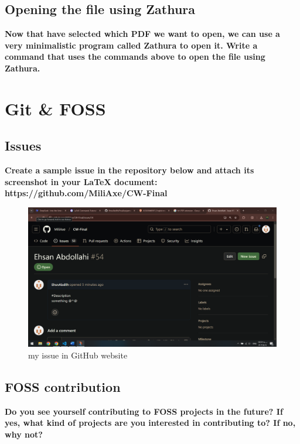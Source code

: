 \documentclass{article}
\begin{document}
    \subsection{Opening the file using Zathura}
    \textbf{Now that have selected which PDF we want to open, we can use a very minimalistic program called Zathura to open it. Write a command that uses the commands above to open the file using Zathura.}

    \section{Git \& FOSS}
    \subsection{Issues}
    \textbf{Create a sample issue in the repository below and attach its screenshot in your LaTeX document: https://github.com/MiliAxe/CW-Final}
    \begin{figure}[h]
        \centering
        \includegraphics[width=1\textwidth]{Screenshot.png}
        \caption{my issue in GitHub website}
        \label{fig:my_image}
    \end{figure}
    \subsection{FOSS contribution}
    \textbf{Do you see yourself contributing to FOSS projects in the future? If yes, what kind of projects are you interested in contributing to? If no, why not?}
\end{document}
